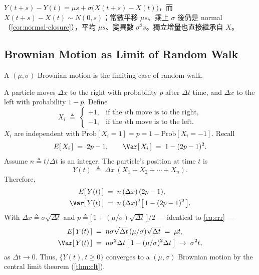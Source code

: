 \suppstart
{}

\begin{remark}
	$Y(t+s)-Y(t)=\mu s+\sigma\bigl(X(t+s)-X(t)\bigr)$，而 $X(t+s)-X(t)\sim N(0,s)$；常數平移 $\mu s$、乘上 $\sigma$ 後仍是 normal（\autoref{cor:normal-closure}），平均 $\mu s$、變異數 $\sigma^{2}s$。獨立增量也直接繼承自 $X$。
\end{remark}
\suppend

\subsection{Brownian Motion as Limit of Random Walk}


\begin{proposition}
	\label{prop:bm-limit}
	A $(\mu,\sigma)$ Brownian motion is the limiting case of random walk.
\end{proposition}

A particle moves $\Delta x$ to the right with probability $p$ after $\Delta t$ time, and $\Delta x$ to the left with probability $1-p$.
Define
\[
	X_{i} \;\triangleq\;
	\begin{cases}
		+1 , & \text{if the $i$th move is to the right}, \\
		-1 , & \text{if the $i$th move is to the left}.
	\end{cases}
\]
$X_{i}$ are independent with $\mathrm{Prob}[X_{i}=1]=p=1-\mathrm{Prob}[X_{i}=-1]$.
Recall
\[
	E[\,X_{i}\,] \;=\; 2p-1 ,
	\qquad
	\Var[\,X_{i}\,] \;=\; 1-(2p-1)^{2} .
\]
Assume $n\triangleq t/\Delta t$ is an integer.
The particle's position at time $t$ is
\[
	Y(t) \;\triangleq\; \Delta x\,(X_{1}+X_{2}+\cdots+X_{n}) .
\]
Therefore,
\begin{align*}
	E[\,Y(t)\,]   & \;=\; n\,(\Delta x)\,(2p-1) ,               \\
	\Var[\,Y(t)\,] & \;=\; n\,(\Delta x)^{2}\bigl[\,1-(2p-1)^{2}\,\bigr] .
\end{align*}
With $\Delta x\triangleq\sigma\sqrt{\Delta t}$ and $p\triangleq\bigl[\,1+(\mu/\sigma)\sqrt{\Delta t}\,\bigr]/2$ --- identical to \eqref{eq:crr} ---
\begin{align*}
	E[\,Y(t)\,]   & \;=\; n\sigma\sqrt{\Delta t}\,(\mu/\sigma)\sqrt{\Delta t} \;=\; \mu t ,                          \\
	\Var[\,Y(t)\,] & \;=\; n\sigma^{2}\Delta t\,\bigl[\,1-(\mu/\sigma)^{2}\Delta t\,\bigr] \;\to\; \sigma^{2}t ,
\end{align*}
as $\Delta t\to0$.
Thus, $\{Y(t),t\ge0\}$ converges to a $(\mu,\sigma)$ Brownian motion by the central limit theorem (\autoref{thm:clt}).

